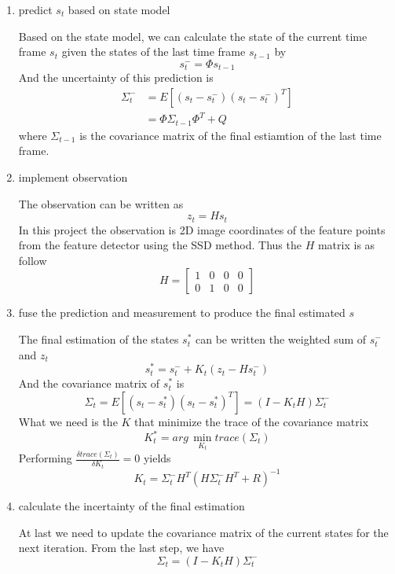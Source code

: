\documentclass{article}
\begin{document}
\begin{enumerate}
\item predict $s_t$ based on state model
\par
Based on the state model, we can calculate the state of the current time frame $s_t$ given the states of the last time frame $s_{t-1}$ by
\begin{equation}
s_{t}^-=\Phi s_{t-1}
\end{equation}
And the uncertainty of this prediction is
\begin{equation}
\begin{split}
\Sigma_t^-&=E\left[ (s_t-s_t^-)(s_t-s_t^-)^T\right]
\\&=\Phi\Sigma_{t-1}\Phi^T+Q
\end{split}
\end{equation}
where $\Sigma_{t-1}$ is the covariance matrix of the final estiamtion of the last time frame.
\item implement observation 
\par
The observation can be written as
\begin{equation}
z_t = Hs_t
\end{equation}
In this project the observation is 2D image coordinates of the feature points from the feature detector using the SSD method. Thus the $H$ matrix is as follow
\begin{equation}
H = \begin{bmatrix}
1&0&0&0\\
0&1&0&0
\end{bmatrix}
\end{equation}
\item fuse the prediction and measurement to produce the final estimated $s$
\par
The final estimation of the states $s_t^*$ can be written the weighted sum of $s_t^-$ and $z_t$
\begin{equation}
s_t^*=s_t^-+K_t(z_t-Hs_t^-)
\end{equation}
And the covariance matrix of $s_t^*$ is
\begin{equation}
\Sigma_t=E\left[(s_t-s_t^*)(s_t-s_t^*)^T\right]=(I-K_tH)\Sigma_t^-
\end{equation}
What we need is the $K$ that minimize the trace of the covariance matrix
\begin{equation}
K_t^*=arg\,\min_{K_t}trace(\Sigma_t)
\end{equation}
Performing $\frac{\delta trace(\Sigma_t)}{\delta K_t}=0$ yields
\begin{equation}
K_t=\Sigma_t^-H^T(H\Sigma_t^-H^T+R)^{-1}
\end{equation}
\item calculate the incertainty of the final estimation 
\par
At last we need to update the covariance matrix of the current states for the next iteration. From the last step, we have
\begin{equation}
\Sigma_t=(I-K_tH)\Sigma_t^-
\end{equation}
\end{enumerate}
\end{document}
